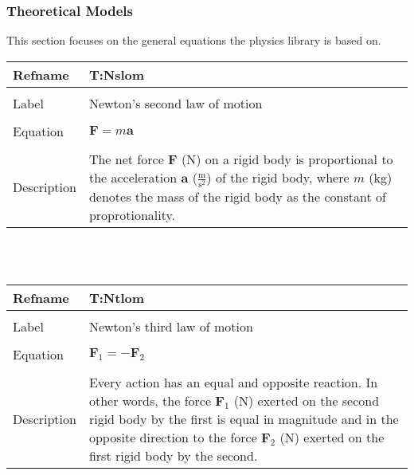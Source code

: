 \documentclass[12pt]{article}
\begin{document}
\subsubsection{Theoretical Models}
\label{Sec:TM}
This section focuses on the general equations the physics library is based on.
~\newline
\noindent \begin{minipage}{\textwidth}
\begin{tabular}{p{} p{}}
\toprule \textbf{Refname} & \textbf{T:Nslom}
\label{T:Nslom}
\\ \midrule \\
Label & Newton's second law of motion
\\ \midrule \\
Equation & $\mathbf{F}=m\mathbf{a}$
\\ \midrule \\
Description & The net force $\mathbf{F}$ (N) on a rigid body is proportional to the acceleration $\mathbf{a}$ ($\frac{\text{m}}{\text{s}^{2}}$) of the rigid body, where $m$ (kg) denotes the mass of the rigid body as the constant of proprotionality.
\\ \bottomrule \end{tabular}
\end{minipage}\\
~\newline
\noindent \begin{minipage}{\textwidth}
\begin{tabular}{p{} p{}}
\toprule \textbf{Refname} & \textbf{T:Ntlom}
\label{T:Ntlom}
\\ \midrule \\
Label & Newton's third law of motion
\\ \midrule \\
Equation & $\mathbf{F}_{1}=-\mathbf{F}_{2}$
\\ \midrule \\
Description & Every action has an equal and opposite reaction. In other words, the force $\mathbf{F}_{1}$ (N) exerted on the second rigid body by the first is equal in magnitude and in the opposite direction to the force $\mathbf{F}_{2}$ (N) exerted on the first rigid body by the second.
\\ \bottomrule \end{tabular}
\end{minipage}\\
~\newline
\end{document}
